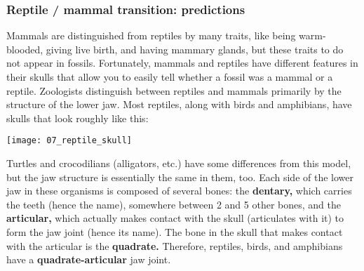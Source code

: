 \documentclass[12pt, hidelinks]{exam}
\begin{document}
\begin{questions}

\newpage

\subsubsection*{Reptile / mammal transition: predictions}

Mammals are distinguished from reptiles by many traits, like being warm-blooded, giving live birth, and having mammary glands, but these traits to do not appear in fossils. %
Fortunately, mammals and reptiles have different features in their skulls that allow you to easily tell whether a fossil was a mammal or a reptile.  Zoologists distinguish between reptiles and mammals primarily by the structure of the lower jaw.  Most reptiles, along with birds and amphibians, have skulls that look roughly like this:

\begin{center}\texttt{[image: 07\_reptile\_skull]}\end{center}

Turtles and crocodilians (alligators, etc.) have some differences from this model, but the jaw structure is essentially the same in them, too.  Each side of the lower jaw in these organisms is composed of several bones:  the \textbf{dentary,} which carries the teeth (hence the name), somewhere between 2 and 5 other bones, and the \textbf{articular,} which actually makes contact with the skull (articulates with it) to form the jaw joint (hence its name).  The bone in the skull that makes contact with the articular is the \textbf{quadrate.}  Therefore, reptiles, birds, and amphibians have a \textbf{quadrate-articular} jaw joint.  


\end{questions}
\end{document}
